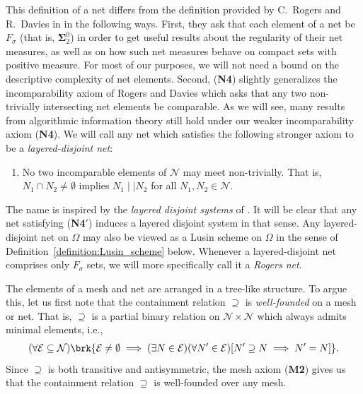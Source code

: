 This definition of a net differs from the definition provided by C.~Rogers and R.~Davies in \cite{Rog70} in the following ways. First, they ask that each element of a net be $F_\sigma$ (that is, $\mathbf{\Sigma}^0_2$) in order to get useful results about the regularity of their net measures, as well as on how such net measures behave on compact sets with positive measure. For most of our purposes, we will not need a bound on the descriptive complexity of net elements.
Second, (\textbf{N4}) slightly generalizes the incomparability axiom of Rogers and Davies which asks that any two non-trivially intersecting net elements be comparable. As we will see, many results from algorithmic information theory still hold under our weaker incomparability axiom (\textbf{N4}). We will call any net which satisfies the following stronger axiom to be a \textit{layered-disjoint net}:
\begin{enumerate}[label=(\roman*)]
    \item[(\textbf{N4}$'$)] No two incomparable elements of $\mathcal{N}$ may meet non-trivially. That is, $N_1 \cap N_2 \neq \emptyset$ implies $N_1 \mid \mid N_2$ for all $N_1, N_2 \in \mathcal{N}$.
\end{enumerate}
The name is inspired by the \textit{layered disjoint systems} of \cite{CL14}. It will be clear that any net satisfying (\textbf{N4}$'$) induces a layered disjoint system in that sense. Any layered-disjoint net on $\Omega$ may also be viewed as a Lusin scheme on $\Omega$ in the sense of Definition~\ref{definition:Lusin_scheme} below. Whenever a layered-disjoint net comprises only $F_\sigma$ sets, we will more specifically call it a \textit{Rogers net}.

The elements of a mesh and net are arranged in a tree-like structure. To argue this, let us first note that the containment relation $\supseteq$ is \textit{well-founded} on a mesh or net. That is, $\supseteq$ is a partial binary relation on $\mathcal{N} \times \mathcal{N}$ which always admits minimal elements, i.e.,
\begin{align*}
    (\forall \mathcal{E} \subseteq \mathcal{N}) \brk{\mathcal{E} \neq \emptyset \implies (\exists N \in \mathcal{E})(\forall N' \in \mathcal{E}) [N' \supseteq N \implies N' = N]}.
\end{align*}
Since $\supseteq$ is both transitive and antisymmetric, the mesh axiom (\textbf{M2}) gives us that the containment relation $\supseteq$ is well-founded over any mesh. 

